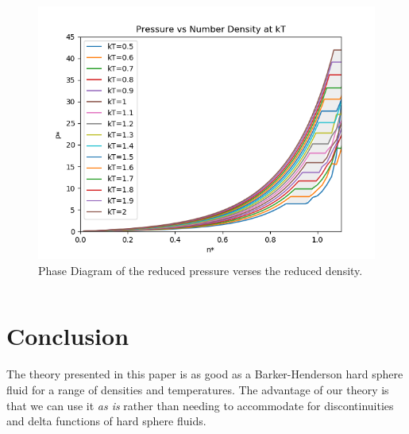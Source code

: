 \documentclass[letterpaper,twocolumn,amsmath,amssymb,prb]{revtex4-1}
\begin{document}
\begin{figure}
 \begin{center}
  \includegraphics[width=\columnwidth]{figs/p-vs-n_at_fixed_T}
 \end{center}
\caption{Phase Diagram of the reduced pressure verses the reduced density.}
\label{fig:p-vs-n_at_fixed_T}
\end{figure}

\[{}\]
\[{}\]
\[{}\]



\section{Conclusion}

The theory presented in this paper is as good as a Barker-Henderson
hard sphere fluid for a range of densities and temperatures. The
advantage of our theory is that we can use it \emph{as is} rather than
needing to accommodate for discontinuities and delta functions of hard
sphere fluids.

\[{}\]
\[{}\]
\[{}\]
\[{}\]
\[{}\]
\[{}\]
\[{}\]
\[{}\]
\[{}\]
\[{}\]
\[{}\]
\[{}\]
\[{}\]
\[{}\]
\[{}\]
\[{}\]
\[{}\]
\[{}\]
\[{}\]
\[{}\]
\[{}\]
\[{}\]
\[{}\]
\[{}\]

 
\end{document}
